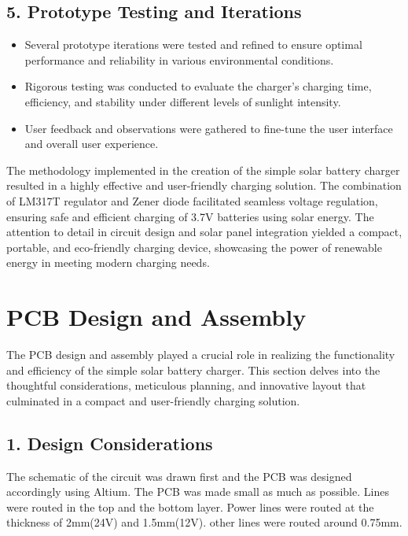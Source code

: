 \documentclass[twocolumn]{article}
\begin{document}
\subsection*{5. Prototype Testing and Iterations}

\begin{itemize}
    \item Several prototype iterations were tested and refined to ensure optimal performance and reliability in various environmental conditions.
    \item Rigorous testing was conducted to evaluate the charger's charging time, efficiency, and stability under different levels of sunlight intensity.
    \item  User feedback and observations were gathered to fine-tune the user interface and overall user experience.
\end{itemize}
\vspace{5pt}

\noindent The methodology implemented in the creation of the simple solar battery charger resulted in a highly effective and user-friendly charging solution. The combination of LM317T regulator and Zener diode facilitated seamless voltage regulation, ensuring safe and efficient charging of 3.7V batteries using solar energy. The attention to detail in circuit design and solar panel integration yielded a compact, portable, and eco-friendly charging device, showcasing the power of renewable energy in meeting modern charging needs.

\section*{PCB Design and Assembly}

The PCB design and assembly played a crucial role in realizing the functionality and efficiency of the simple solar battery charger. This section delves into the thoughtful considerations, meticulous planning, and innovative layout that culminated in a compact and user-friendly charging solution.

\subsection*{1. Design Considerations}
The schematic of the circuit was drawn first and 
the PCB was designed accordingly using 
Altium. The PCB was made small as much as 
possible. Lines were routed in the top and the 
bottom layer. Power lines were routed at the 
thickness of 2mm(24V) and 1.5mm(12V). other 
lines were routed around 0.75mm. 
\vspace{5pt}
\end{document}
